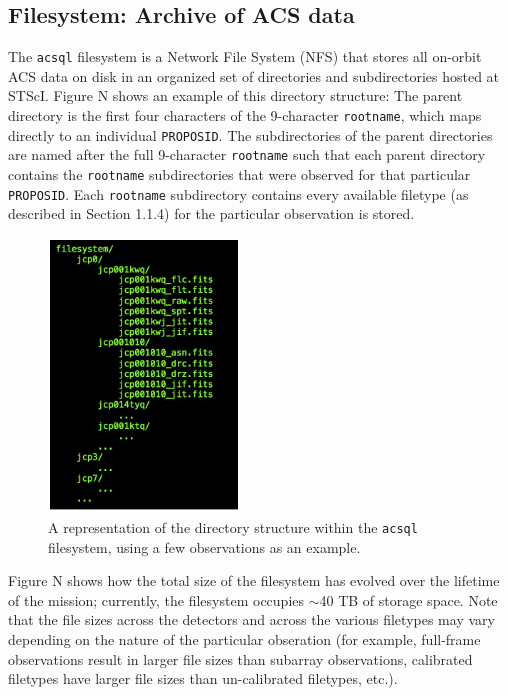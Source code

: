 \documentclass[10pt,journal,compsoc]{IEEEtran}
\begin{document}
\subsection{Filesystem: Archive of ACS data}

The \texttt{acsql} filesystem is a Network File System (NFS) that stores all on-orbit
ACS data on disk in an organized set of directories and subdirectories hosted at STScI. Figure N shows
an example of this directory structure: The parent directory is the first four characters
of the 9-character \texttt{rootname}, which maps directly to an individual \texttt{PROPOSID}.
The subdirectories of the parent directories are named after the full 9-character
\texttt{rootname} such that each parent directory contains the \texttt{rootname} subdirectories
that were observed for that particular \texttt{PROPOSID}.  Each \texttt{rootname}
subdirectory contains every available filetype (as described in Section 1.1.4) for the
particular observation is stored.

\begin{figure}[!t]
\centering
\includegraphics[width=2.0in]{./figures/filesystem_structure.png}
\caption{A representation of the directory structure within the \texttt{acsql} filesystem,
using a few observations as an example.}
\label{fig1}
\end{figure}

Figure N shows how the total size of the filesystem has evolved over the lifetime of the
mission; currently, the filesystem occupies $\sim${40} TB of storage space.  Note that the
file sizes across the detectors and across the various filetypes may vary depending on the
nature of the particular obseration (for example, full-frame observations result in larger
file sizes than subarray observations, calibrated filetypes have larger file sizes than
un-calibrated filetypes, etc.).
\end{document}
